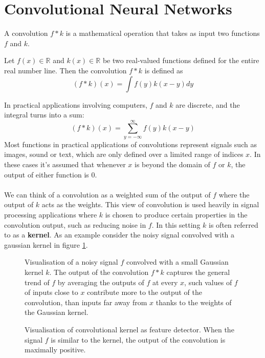 \section{Convolutional Neural Networks}
A convolution $f * k$ is a mathematical operation that takes as input two functions $f$ and $k$.

\begin{definition}[convolution] \label{convolution}
	Let $f(x) \in \mathbb{R}$ and $k(x) \in \mathbb{R}$ be two real-valued functions defined for the entire real number line. Then the convolution $f * k$ is defined as
	$$
		(f * k)(x) = \int f(y)k(x - y)dy
	$$
\end{definition}

In practical applications involving computers, $f$ and $k$ are discrete, and the integral turns into a sum:
$$
(f * k)(x) = \sum\limits_{y=-\infty}^\infty f(y)k(x - y)
$$
Most functions in practical applications of convolutions represent signals such as images, sound or text, which are only defined over a limited range of indices $x$. In these cases it's assumed that whenever $x$ is beyond the domain of $f$ or $k$, the output of either function is 0.
\\\\
We can think of a convolution as a weighted sum of the output of $f$ where the output of $k$ acts as the weights. This view of convolution is used heavily in signal processing applications where $k$ is chosen to produce certain properties in the convolution output, such as reducing noise in $f$. In this setting $k$ is often referred to as a \textbf{kernel}. As an example consider the noisy signal convolved with a gaussian kernel in figure \ref{gaussian_convolution}.

\begin{figure}
	\centering
	
	\caption{Visualisation of a noisy signal $f$ convolved with a small Gaussian kernel $k$. The output of the convolution $f * k$ captures the general trend of $f$ by averaging the outputs of $f$ at every $x$, such values of $f$ of inputs close to $x$ contribute more to the output of the convolution, than inputs far away from $x$ thanks to the weights of the Gaussian kernel.}
	\label{gaussian_convolution}
\end{figure}

\begin{figure}
	\centering
	
	\caption{Visualisation of convolutional kernel as feature detector. When the signal $f$ is similar to the kernel, the output of the convolution is maximally positive.}
	\label{feature_detector}
\end{figure}

